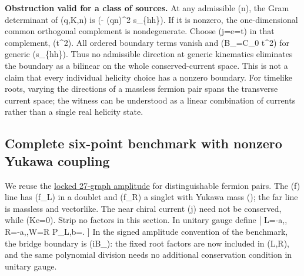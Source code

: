 \documentclass[
  11pt,
]{article}
\begin{document}
\textbf{Obstruction valid for a class of sources.} At any admissible
(n), the Gram determinant of (q,K,n) is (- (q\cdot n)\^{}2 s\_\{hh\}).
If it is nonzero, the one-dimensional common orthogonal complement is
nondegenerate. Choose (j=e=t) in that complement, (t\^{}2). All
ordered boundary terms vanish and (B\_\infty=C\_0 t\^{}2) for
generic (s\_\{hh\}). Thus no admissible direction at generic kinematics
eliminates the boundary as a bilinear on the whole conserved-current
space. This is not a claim that every individual helicity choice has a
nonzero boundary. For timelike roots, varying the directions of a
massless fermion pair spans the transverse current space; the witness
can be understood as a linear combination of currents rather than a
single real helicity state.

\subsection{Complete six-point benchmark with nonzero Yukawa
coupling}\label{complete-six-point-benchmark-with-nonzero-yukawa-coupling}

We reuse the
\href{https://github.com/lm846802297-bit/off-shell-vector-polarization/tree/ba7dfb747da24809d1c1d9250bd9f8f6ce3677bf/research-baselines/su2-sixpoint-connected-tree}{locked
27-graph amplitude} for distinguishable fermion pairs. The (f) line has
(f\_L) in a doublet and (f\_R) a singlet with Yukawa mass (\mu); the far
line is massless and vectorlike. The near chiral current (j) need not be
conserved, while (K\cdot e=0). Strip no factors in this section. In
unitary gauge define {[} L=-a,,\qquad
R=-a,,\qquad W=\not R P\_L,\quad b=. {]}
In the signed amplitude convention of the benchmark, the bridge boundary
is (iB\_\infty[L,R]): the fixed root factors are now included in (L,R),
and the same polynomial division needs no additional conservation
condition in unitary gauge.
\end{document}

